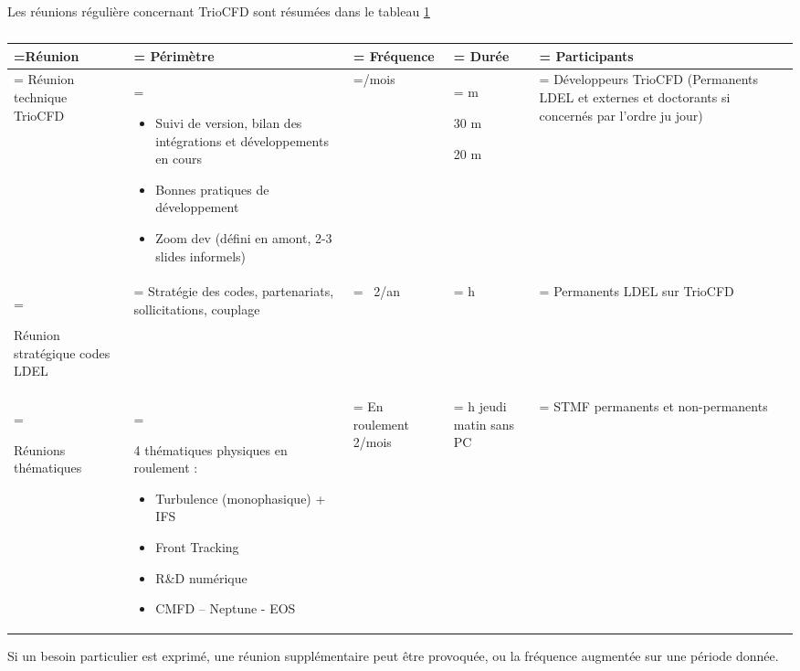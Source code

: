 Les réunions régulière concernant TrioCFD sont résumées dans le tableau \ref{tab:reunions}
\begin{landscape}

\begin{table}[p]
\centering
\caption{}
\label{tab:reunions}
\begin{tabularx}{\textheight}{|>{\hsize=1.0\hsize\linewidth=\hsize}X|>{\hsize=2.0\hsize\linewidth=\hsize}X|>{\hsize=0.5\hsize\linewidth=\hsize}X|>{\hsize=0.5\hsize\linewidth=\hsize}X|>{\hsize=1.0\hsize\linewidth=\hsize}X|}
\hline 
Réunion & Périmètre & Fréquence & Durée & Participants \\

\hline 

\centering
Réunion technique TrioCFD  & 
\begin{itemize}
\item Suivi de version, bilan des intégrations et développements en cours
\item Bonnes pratiques de développement
\item Zoom dev (défini en amont, 2-3 slides informels)
\end{itemize}
&
1/mois
& 
10 m

30 m

20 m
& 
Développeurs TrioCFD (Permanents LDEL et  externes et doctorants si concernés par l'ordre ju jour) \\

\hline 

\centering
Réunion stratégique codes LDEL & Stratégie des codes, partenariats, sollicitations, couplage & ~2/an & 2 h & Permanents LDEL sur TrioCFD \\

\hline 

\centering
Réunions thématiques & 

4 thématiques physiques en roulement :
\begin{itemize}
\item Turbulence (monophasique) + IFS
\item Front Tracking 
\item R\&D numérique
\item CMFD -- Neptune - EOS
\end{itemize}
& 
En roulement 
2/mois
&
1 h jeudi matin
sans PC
& 
STMF
permanents et non-permanents \\
\hline 
\end{tabularx}
\end{table}
\end{landscape}
Si un besoin particulier est exprimé, une réunion supplémentaire peut être provoquée, ou la fréquence augmentée sur une période donnée.


